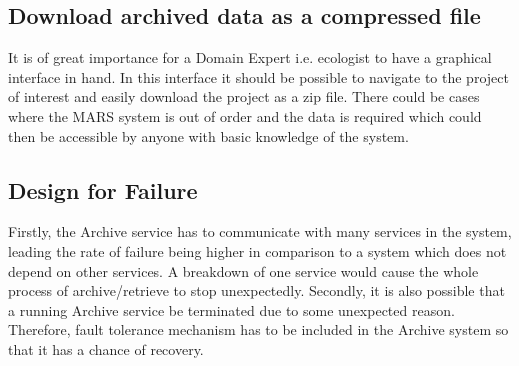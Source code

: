         \subsection{Download archived data as a compressed file}
            It is of great importance for a Domain Expert i.e. ecologist to have a graphical interface in hand. In this interface
            it should be possible to navigate to the project of interest and easily download the project as a zip file. There could be cases where the
            MARS system is out of order and the data is required which could then be accessible by anyone with basic knowledge of the system.
        
        \subsection{Design for Failure}   
        Firstly, the Archive service has to communicate with many services in the system, leading the rate of failure being higher
        in comparison to a system which does not depend on other services. A breakdown 
        of one service would cause the whole process of archive/retrieve to stop unexpectedly.  Secondly, it is also possible that a running Archive service be terminated
        due to some unexpected reason. Therefore, fault tolerance mechanism has to be included in the Archive system so that it has a chance of 
        recovery. 

